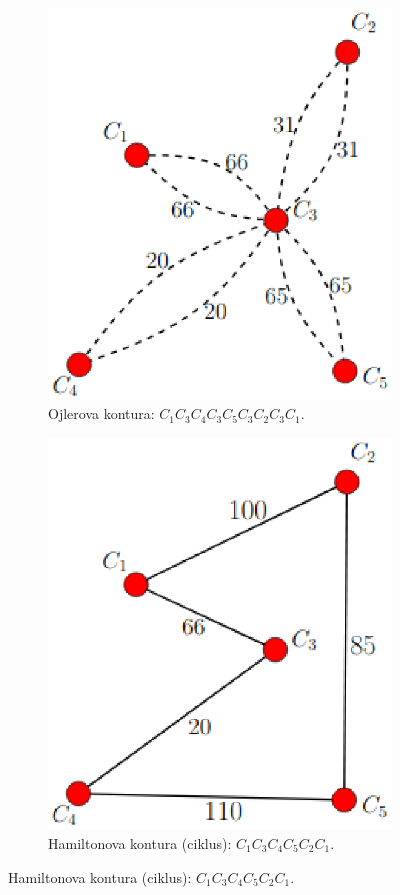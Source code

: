 \documentclass[a4paper, utf8, 11pt, colorlinks]{article}
\begin{document}
 \begin{figure}[!ht]
 	\begin{subfigure}{.45\textwidth}
 		\centering
 		\includegraphics[width=.7\linewidth]{tsp-2a}  
 		\caption{Ojlerova kontura: $C_1 C_3 C_4 C_3 C_5 C_3 C_2 C_3 C_1$.}  
 		\label{fig:tsp-1}
 	\end{subfigure}
 	\begin{subfigure}{.45\textwidth}
 		\centering
 		\includegraphics[width=.7\linewidth]{tsp-3a}  
 		\caption{Hamiltonova kontura (ciklus): $C_1C_3C_4C_5C_2C_1$.} 
 		\label{fig:tsp-1a}
 	\end{subfigure}
 \end{figure}
\end{document}
